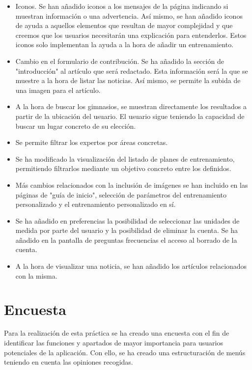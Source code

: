 \documentclass[a4paper]{article}
\begin{document}
\begin{itemize}
	\item   Iconos. Se han añadido iconos a los mensajes de la página indicando si muestran información o una advertencia. Así mismo, se han añadido iconos de ayuda a aquellos elementos que resultan de mayor complejidad y que creemos que los usuarios necesitarán una explicación para entenderlos. Estos iconos solo implementan la ayuda a la hora de añadir un entrenamiento.
	
	\item   Cambio en el formulario de contribución. Se ha añadido la sección de "introducción" al artículo que será redactado. Esta información será la que se muestre a la hora de listar las noticias. Así mismo, se permite la subida de una imagen para el artículo.
	
	\item   A la hora de buscar los gimnasios, se muestran directamente los resultados a partir de la ubicación del usuario. El usuario sigue teniendo la capacidad de buscar un lugar concreto de su elección.
	
	\item   Se permite filtrar los expertos por áreas concretas.
	
	\item   Se ha modificado la visualización del listado de planes de entrenamiento, permitiendo filtrarlos mediante un objetivo concreto entre los definidos.
	
	\item   Más cambios relacionados con la inclusión de imágenes se han incluido en las páginas de "guía de inicio", selección de parámetros del entrenamiento personalizado y el entrenamiento personalizado en sí.
	
	\item   Se ha añadido en preferencias la posibilidad de seleccionar las unidades de medida por parte del usuario y la posibilidad de eliminar la cuenta. Se ha añadido en la pantalla de preguntas frecuencias el acceso al borrado de la cuenta.
	
	\item   A la hora de visualizar una noticia, se han añadido los artículos relacionados con la misma.
\end{itemize}


\section{Encuesta}
 Para la realización de esta práctica se ha creado una encuesta con el fin de identificar las funciones y apartados de mayor importancia para usuarios potenciales de la aplicación. Con ello, se ha creado una estructuración de menús teniendo en cuenta las opiniones recogidas.
 
\end{document}
